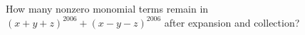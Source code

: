 How many nonzero monomial terms remain in $(x+y+z)^{2006}+(x-y-z)^{2006}$ after expansion and collection?
